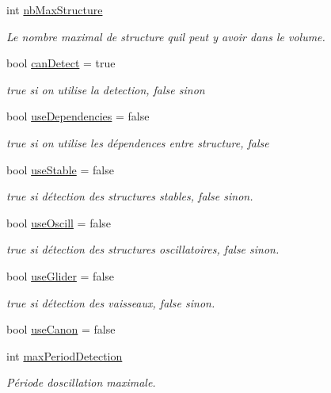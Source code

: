 \begin{DoxyCompactItemize}
int \mbox{\hyperlink{class_detection_a3cb9e6ab5eb48c7352b5402e9d46c4e6}{nb\+Max\+Structure}}
\begin{DoxyCompactList}\small\item\em Le nombre maximal de structure qu\textquotesingle{}il peut y avoir dans le volume. \end{DoxyCompactList}\item 
bool \mbox{\hyperlink{class_detection_a699901c5a7439b08e8ac5c36942bb61b}{can\+Detect}} = true
\begin{DoxyCompactList}\small\item\em true si on utilise la detection, false sinon \end{DoxyCompactList}\item 
bool \mbox{\hyperlink{class_detection_abe71ec7aa825173786fd273323343c11}{use\+Dependencies}} = false
\begin{DoxyCompactList}\small\item\em true si on utilise les dépendences entre structure, false \end{DoxyCompactList}\item 
bool \mbox{\hyperlink{class_detection_a78bb8c89cca9479bb2bb4ef0f5e96945}{use\+Stable}} = false
\begin{DoxyCompactList}\small\item\em true si détection des structures stables, false sinon. \end{DoxyCompactList}\item 
bool \mbox{\hyperlink{class_detection_a9597ce1e1dea98c61902d891c1f1c7e0}{use\+Oscill}} = false
\begin{DoxyCompactList}\small\item\em true si détection des structures oscillatoires, false sinon. \end{DoxyCompactList}\item 
bool \mbox{\hyperlink{class_detection_af1181c7a5cdf8fe0f94e2e6526a1ffb1}{use\+Glider}} = false
\begin{DoxyCompactList}\small\item\em true si détection des vaisseaux, false sinon. \end{DoxyCompactList}\item 
bool \mbox{\hyperlink{class_detection_a3fe2d8aec9ad4e2a8f11902ba873db52}{use\+Canon}} = false
\item 
int \mbox{\hyperlink{class_detection_a98167fc0f3e26398cfd51f95b6a64e72}{max\+Period\+Detection}}
\begin{DoxyCompactList}\small\item\em Période d\textquotesingle{}oscillation maximale. \end{DoxyCompactList}\item 

\end{DoxyCompactItemize}
